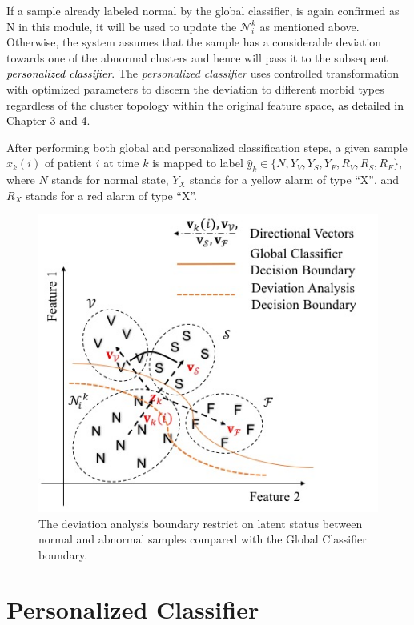 If a sample already labeled normal by the global classifier, is again confirmed as N in this module, it will be used to update the $\mathcal{N}_i^k$ as mentioned above. Otherwise, the system assumes that the sample has a considerable deviation towards one of the abnormal clusters and hence will pass it to the subsequent \textcolor{black}{\textit{personalized classifier}}. The \textit{personalized classifier} uses controlled transformation with optimized parameters to discern the deviation to different morbid types regardless of the cluster topology within the original feature space\textcolor{black}{, as detailed in Chapter 3 and 4}. 

After performing both global and personalized classification steps, a given sample $x_k(i)$ of patient $i$ at time $k$ is mapped to label $\hat{y}_k \in \{N,Y_V,Y_S,Y_F,R_V,R_S,R_F\}$, where $N$ stands for normal state, $Y_X$ stands for a yellow alarm of type ``X'', and $R_X$ stands for a red alarm of type ``X''.

\begin{figure}[t]
\centering
\includegraphics[scale=.7]{Fig/topology.jpg}
\caption{The deviation analysis boundary restrict on latent status between normal and abnormal samples compared with the Global Classifier boundary.}
\label{fig:topo_deviation}
\end{figure}


\section{Personalized Classifier} %

